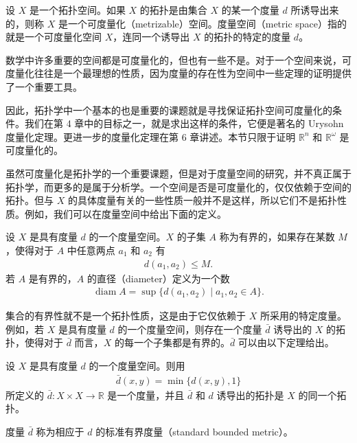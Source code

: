 \documentclass[../../main.tex]{subfiles}
\begin{document}
\begin{definition}[可度量化空间与有界集]\label{definition:ch02-可度量化有界集}
设 $X$ 是一个拓扑空间。如果 $X$ 的拓扑是由集合 $X$ 的某一个度量 $d$ 所诱导出来的，则称 $X$ 是一个可度量化（metrizable）空间。度量空间（metric space）指的就是一个可度量化空间 $X$，连同一个诱导出 $X$ 的拓扑的特定的度量 $d$。

数学中许多重要的空间都是可度量化的，但也有一些不是。对于一个空间来说，可度量化往往是一个最理想的性质，因为度量的存在性为空间中一些定理的证明提供了一个重要工具。

因此，拓扑学中一个基本的也是重要的课题就是寻找保证拓扑空间可度量化的条件。我们在第 4 章中的目标之一，就是求出这样的条件，它便是著名的 Urysohn 度量化定理。更进一步的度量化定理在第 6 章讲述。本节只限于证明 $\mathbb{R}^{n}$ 和 $\mathbb{R}^{\omega}$ 是可度量化的。

虽然可度量化是拓扑学的一个重要课题，但是对于度量空间的研究，并不真正属于拓扑学，而更多的是属于分析学。一个空间是否是可度量化的，仅仅依赖于空间的拓扑。但与 $X$ 的具体度量有关的一些性质一般并不是这样，所以它们不是拓扑性质。例如，我们可以在度量空间中给出下面的定义。

设 $X$ 是具有度量 $d$ 的一个度量空间。$X$ 的子集 $A$ 称为有界的，如果存在某数 $M$，使得对于 $A$ 中任意两点 $a_{1}$ 和 $a_{2}$ 有
\begin{align*}
d(a_{1}, a_{2}) \leqslant M.
\end{align*}
若 $A$ 是有界的，$A$ 的直径（diameter）定义为一个数
\begin{align*}
\operatorname{diam} A = \sup \{d(a_{1}, a_{2}) \mid a_{1}, a_{2} \in A\}.
\end{align*}
\end{definition}

集合的有界性就不是一个拓扑性质，这是由于它仅依赖于 $X$ 所采用的特定度量。例如，若 $X$ 是具有度量 $d$ 的一个度量空间，则存在一个度量 $\bar{d}$ 诱导出的 $X$ 的拓扑，使得对于 $\bar{d}$ 而言，$X$ 的每一个子集都是有界的。$\bar{d}$ 可以由以下定理给出。

\begin{theorem}[标准有界度量]\label{theorem:ch02-标准有界度量}
设 $X$ 是具有度量 $d$ 的一个度量空间。则用
\begin{align*}
\bar{d}(x, y) = \min \{d(x, y), 1\}
\end{align*}
所定义的 $\bar{d}: X \times X \rightarrow \mathbb{R}$ 是一个度量，并且 $\bar{d}$ 和 $d$ 诱导出的拓扑是 $X$ 的同一个拓扑。

度量 $\bar{d}$ 称为相应于 $d$ 的标准有界度量（standard bounded metric）。
\end{theorem}
\end{document}
